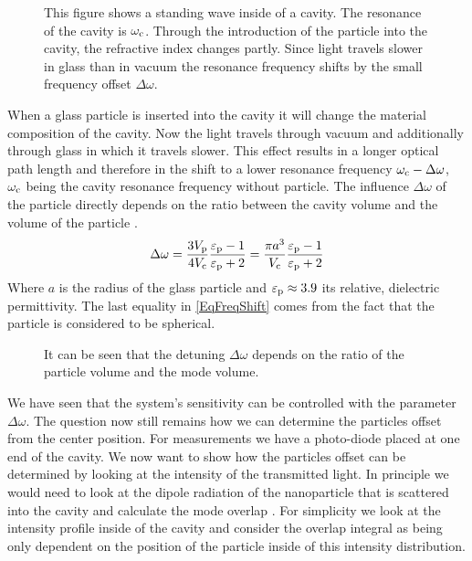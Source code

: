 \begin{figure}[H]
	
	\caption{This figure shows a standing wave inside of a cavity. The resonance of the cavity is $\de{\omega}{c}$. Through the introduction of the particle into the cavity, the refractive index changes partly. Since light travels slower in glass than in vacuum the resonance frequency shifts by the small frequency offset $\Delta\omega$.}
	\label{fig:CavityDetection}
\end{figure}

When a glass particle is inserted into the cavity it will change the material composition of the cavity. Now the light travels through vacuum and additionally through glass in which it travels slower. This effect results in a longer optical path length and therefore in the shift to a lower resonance frequency $\de{\omega}{c}-\Delta\omega$, $\de{\omega}{c}$ being the cavity resonance frequency without particle. The influence $\Delta\omega$ of the particle directly depends on the ratio between the cavity volume and the volume of the particle \cite{chang2010cavity}.
\begin{equation}\label{EqFreqShift}
	\Delta\omega=\frac{3\de{V}{p}}{4\de{V}{c}}\frac{\de{\varepsilon}{p}-1}{\de{\varepsilon}{p}+2}=\frac{\pi a^3}{\de{V}{c}}\frac{\de{\varepsilon}{p}-1}{\de{\varepsilon}{p}+2}
\end{equation}
Where $a$ is the radius of the glass particle and $\de{\varepsilon}{p}\approx 3.9$ its relative, dielectric permittivity. The last equality in \autoref{EqFreqShift} comes from the fact that the particle is considered to be spherical.

\begin{figure}[H]
	
	\caption{It can be seen that the detuning $\Delta\omega$ depends on the ratio of the particle volume and the mode volume.}
	\label{fig:FreqShift}
\end{figure}

We have seen that the system's sensitivity can be controlled with the parameter $\Delta\omega$. The question now still remains how we can determine the particles offset from the center position. For measurements we have a photo-diode placed at one end of the cavity. We now want to show how the particles offset can be determined by looking at the intensity of the transmitted light. In principle we would need to look at the dipole radiation of the nanoparticle that is scattered into the cavity and calculate the mode overlap \cite{chang2010cavity}. For simplicity we look at the intensity profile inside of the cavity and consider the overlap integral as being only dependent on the position of the particle inside of this intensity distribution.


